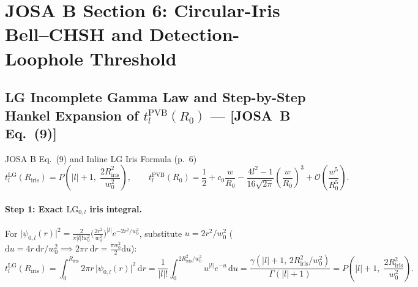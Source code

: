 \documentclass[10pt,letterpaper]{article}
\newcommand{\abs}[1]{\lvert #1 \rvert}
\newcommand{\dd}{\mathrm{d}}
\newcommand{\josb}[1]{\textbf{[JOSA~B Eq.~(#1)]}}
\numberwithin{equation}{section}
\begin{document}
\section{JOSA B Section 6: Circular-Iris Bell--CHSH and Detection-Loophole Threshold}
\label{sec:b6}

\subsection{LG Incomplete Gamma Law and Step-by-Step Hankel Expansion of $t_l^{\mathrm{PVB}}(R_0)$ --- \josb{9}}
\label{sec:b6_iris}

\begin{targeteq}{JOSA B Eq.~(9) and Inline LG Iris Formula (p.~6)}
\[
  t_l^{\mathrm{LG}}(R_{\mathrm{iris}}) = P\!\left(\abs{l}+1,\;\frac{2R_{\mathrm{iris}}^2}{w_0^2}\right), \qquad
  t_l^{\mathrm{PVB}}(R_0) = \frac{1}{2} + c_0\frac{w}{R_0} - \frac{4l^2 - 1}{16\sqrt{2\pi}}\left(\frac{w}{R_0}\right)^3 + \mathcal{O}\!\left(\frac{w^5}{R_0^5}\right).
\]
\end{targeteq}

\paragraph*{Step 1: Exact $\mathrm{LG}_{0,l}$ iris integral.}
For $\abs{\psi_{0,l}(r)}^2 = \frac{2}{\pi\abs{l}! w_0^2}\bigl(\frac{2r^2}{w_0^2}\bigr)^{\abs{l}} e^{-2r^2/w_0^2}$, substitute $u = 2r^2/w_0^2$ ($\dd u = 4r\,\dd r/w_0^2 \implies 2\pi r\,\dd r = \frac{\pi w_0^2}{2}\dd u$):
\begin{equation}
  t_l^{\mathrm{LG}}(R_{\mathrm{iris}}) = \int_0^{R_{\mathrm{iris}}} 2\pi r\,\abs{\psi_{0,l}(r)}^2\,\dd r = \frac{1}{\abs{l}!}\int_0^{2R_{\mathrm{iris}}^2/w_0^2} u^{\abs{l}} e^{-u}\,\dd u = \frac{\gamma(\abs{l}+1,\,2R_{\mathrm{iris}}^2/w_0^2)}{\Gamma(\abs{l}+1)} = P\!\left(\abs{l}+1,\;\frac{2R_{\mathrm{iris}}^2}{w_0^2}\right).
\end{equation}
\end{document}
